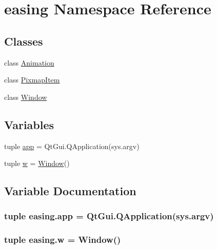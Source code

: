 \hypertarget{namespaceeasing}{}\section{easing Namespace Reference}
\label{namespaceeasing}
\subsection*{Classes}
\begin{DoxyCompactItemize}
\item 
class \hyperlink{classeasing_1_1Animation}{Animation}
\item 
class \hyperlink{classeasing_1_1PixmapItem}{Pixmap\+Item}
\item 
class \hyperlink{classeasing_1_1Window}{Window}
\end{DoxyCompactItemize}
\subsection*{Variables}
\begin{DoxyCompactItemize}
\item 
tuple \hyperlink{namespaceeasing_adf221e95e5f35adaf5f2c436aac18a6f}{app} = Qt\+Gui.\+Q\+Application(sys.\+argv)
\item 
tuple \hyperlink{namespaceeasing_ab8bda0698181c0c1e1d9156b36771e93}{w} = \hyperlink{classeasing_1_1Window}{Window}()
\end{DoxyCompactItemize}


\subsection{Variable Documentation}
\hypertarget{namespaceeasing_adf221e95e5f35adaf5f2c436aac18a6f}{}
\subsubsection[{app}]{\setlength{\rightskip}{0pt plus 5cm}tuple easing.\+app = Qt\+Gui.\+Q\+Application(sys.\+argv)}\label{namespaceeasing_adf221e95e5f35adaf5f2c436aac18a6f}
\hypertarget{namespaceeasing_ab8bda0698181c0c1e1d9156b36771e93}{}
\subsubsection[{w}]{\setlength{\rightskip}{0pt plus 5cm}tuple easing.\+w = {\bf Window}()}\label{namespaceeasing_ab8bda0698181c0c1e1d9156b36771e93}

